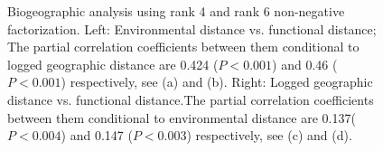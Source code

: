 \begin{figure}[!ht]
 \caption{Biogeographic analysis using rank 4 and rank 6 non-negative factorization. Left: Environmental distance vs. functional distance; The partial correlation coefficients between them conditional to logged geographic distance are 0.424 ($P<0.001$) and 0.46 ($P<0.001$) respectively, see (a) and (b). Right: Logged geographic distance vs. functional distance.The partial correlation coefficients between them conditional to environmental distance are 0.137($P<0.004$) and 0.147 ($P<0.003$) respectively, see (c) and (d). }
 \label{scatterplot}
\end{figure}




